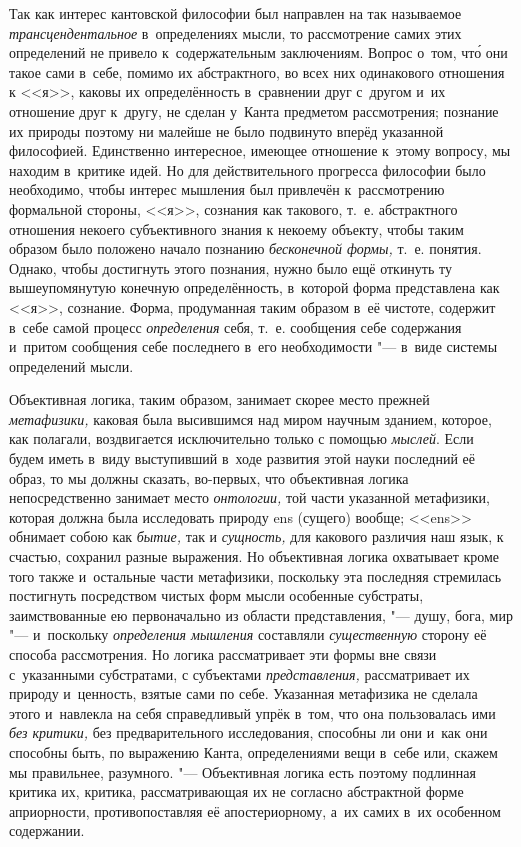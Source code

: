 Так как интерес кантовской философии был направлен на так называемое
{\em трансцендентальное} в~определениях мысли, то
рассмотрение самих этих определений не привело к~содержательным
заключениям. Вопрос о~том, чт\'{о} они такое сами в~себе, помимо их
абстрактного, во всех них одинакового отношения к <<я>>, каковы их
определённость в~сравнении друг с~другом и~их отношение друг к~другу, не
сделан у~Канта предметом рассмотрения; познание их природы поэтому ни
малейше не было подвинуто вперёд указанной философией. Единственно
интересное, имеющее отношение к~этому вопросу, мы находим в~критике идей.
Но для действительного прогресса философии было необходимо, чтобы интерес
мышления был привлечён к~рассмотрению формальной стороны, <<я>>, сознания как
такового, т.~е. абстрактного отношения некоего субъективного знания к
некоему объекту, чтобы таким образом было положено начало познанию
{\em бесконечной формы,} т.~е. понятия. Однако, чтобы
достигнуть этого познания, нужно было ещё откинуть ту вышеупомянутую
конечную определённость, в~которой форма представлена как <<я>>, сознание.
Форма, продуманная таким образом в~её чистоте, содержит в~себе самой
процесс {\em определения} себя, т.~е. сообщения себе
содержания и~притом сообщения себе последнего в~его необходимости "--- в~виде
системы определений мысли.

Объективная логика, таким образом, занимает скорее место прежней
{\em метафизики,} каковая была высившимся над миром
научным зданием, которое, как полагали, воздвигается исключительно только с
помощью {\em мыслей}. Если будем иметь в~виду
выступивший в~ходе развития этой науки последний её
образ,
то мы должны сказать, во-первых, что объективная логика непосредственно
занимает место {\em онтологии,} той части указанной
метафизики, которая должна была исследовать природу ens (сущего) вообще;
<<ens>> обнимает собою как {\em бытие,} так и
{\em сущность,} для какового различия наш язык, к
счастью, сохранил разные выражения. Но объективная логика охватывает кроме
того также и~остальные части метафизики, поскольку эта последняя стремилась
постигнуть посредством чистых форм мысли особенные субстраты,
заимствованные ею первоначально из области представления, "--- душу, бога,
мир "--- и~поскольку {\em определения мышления} составляли
{\em существенную} сторону её способа рассмотрения. Но
логика рассматривает эти формы вне связи с~указанными субстратами, с
субъектами {\em представления,} рассматривает их
природу и~ценность, взятые сами по себе. Указанная метафизика не сделала
этого и~навлекла на себя справедливый упрёк в~том, что она пользовалась ими
{\em без критики,} без предварительного исследования,
способны ли они и~как они способны быть, по выражению Канта, определениями
вещи в~себе или, скажем мы правильнее, разумного. "--- Объективная логика есть
поэтому подлинная критика их, критика, рассматривающая их не согласно
абстрактной форме априорности, противопоставляя её апостериорному, а~их
самих в~их особенном содержании.

